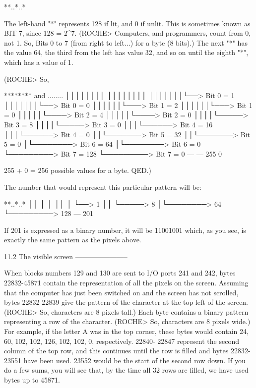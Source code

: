         **..*..*

The  left-hand  "*" represents 128 if lit, and 0 if unlit. This  is  sometimes 
known  as  BIT 7, since 128 = 2^7. (ROCHE> Computers, and  programmers,  count 
from  0, not 1. So, Bits 0 to 7 (from right to left...) for a byte (8  bits).) 
The next "*" has the value 64, the third from the left has value 32, and so on 
until the eighth "*", which has a value of 1.


(ROCHE> So,

        ********                      and      ........
        ││││││││                               ││││││││
        │││││││└──> Bit 0 =   1                │││││││└──> Bit 0 =   0
        ││││││└───> Bit 1 =   2                ││││││└───> Bit 1 =   0        
        │││││└────> Bit 2 =   4                │││││└────> Bit 2 =   0        
        ││││└─────> Bit 3 =   8                ││││└─────> Bit 3 =   0        
        │││└──────> Bit 4 =  16                │││└──────> Bit 4 =   0        
        ││└───────> Bit 5 =  32                ││└───────> Bit 5 =   0        
        │└────────> Bit 6 =  64                │└────────> Bit 6 =   0        
        └─────────> Bit 7 = 128                └─────────> Bit 7 =   0        
                            ---                                    ---        
                            255                                      0        

255 + 0 = 256 possible values for a byte. QED.)

The number that would represent this particular pattern will be:

        **..*..*
        ││  │  │
        ││  │  └──>   1
        ││  └─────>   8
        │└────────>  64
        └─────────> 128
                    ---
                    201

If 201 is expressed as a binary number, it will be 11001001 which, as you see, 
is exactly the same pattern as the pixels above.


11.2 The visible screen
-----------------------

When  blocks  numbers  129 and 130 are sent to I/O ports 241  and  242,  bytes 
22832-45871  contain  the  representation of all the  pixels  on  the  screen. 
Assuming  that the computer has just been switched on and the screen  has  not 
scrolled, bytes 22832-22839 give the pattern of the character at the top  left 
of the screen. (ROCHE> So, characters are 8 pixels tall.) Each byte contains a 
binary pattern representing a row of the character. (ROCHE> So, characters are 
8  pixels  wide.) For example, if the letter A was in the  top  corner,  these 
bytes  would contain 24, 60, 102, 102, 126, 102, 102, 0, respectively.  22840-
22847 represent the second column of the top row, and this continues until the 
row  is filled and bytes 22832-23551 have been used. 23552 would be the  start 
of  the second row down. If you do a few sums, you will see that, by the  time 
all 32 rows are filled, we have used bytes up to 45871.


